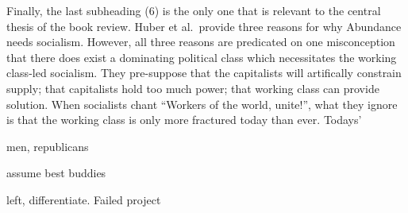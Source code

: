 \documentclass[12pt]{article}
\begin{document}
Finally, the last subheading (6) is the only one that is relevant to the central thesis of the book review. Huber et al.\ provide three reasons for why Abundance needs socialism. However, all three reasons are predicated on one misconception\textemdash{} that there does exist a dominating political class which necessitates the working class-led socialism. They pre-suppose that the capitalists will artifically constrain supply; that capitalists hold too much power; that working class can provide solution. When socialists chant ``Workers of the world, unite!'', what they ignore is that the working class is only more fractured today than ever. Todays' 

men, republicans

assume best buddies


left, differentiate. Failed project
\end{document}
